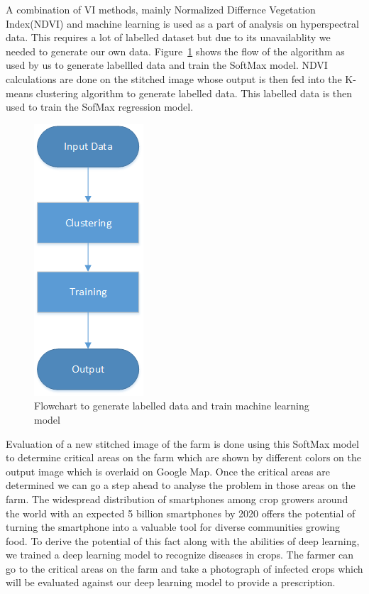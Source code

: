 A combination of VI methods, mainly Normalized Differnce Vegetation Index(NDVI) and machine learning is used as a part of analysis on hyperspectral data. This requires a lot of labelled dataset but due to its unavailablity we needed to generate our own data. Figure~\ref{fig: dada} shows the flow of the algorithm as used by us to generate labellled data and train the SoftMax model. NDVI calculations are done on the stitched image whose output is then fed into the K-means clustering algorithm to generate labelled data. This labelled data is then used to train the SofMax regression model. 
\begin{figure}[h]
	\includegraphics[height=1.0\linewidth]{dada}
	\centering
	\caption{\label{fig: dada}Flowchart to generate labelled data and train machine learning model}
\end{figure}


Evaluation of a new stitched image of the farm is done using this SoftMax model to determine critical areas on the farm which are shown by different colors on the output image which is overlaid on Google Map. Once the critical areas are determined we can go a step ahead to analyse the problem in those areas on the farm. The widespread distribution of smartphones among crop growers around the world with an expected 5 billion smartphones by 2020 offers the potential of turning the smartphone into a valuable tool for diverse communities growing food. To derive the potential of this fact along with the abilities of deep learning, we trained a deep learning model to recognize diseases in crops. The farmer can go to the critical areas on the farm and take a photograph of infected crops which will be evaluated against our deep learning model to provide a prescription.




